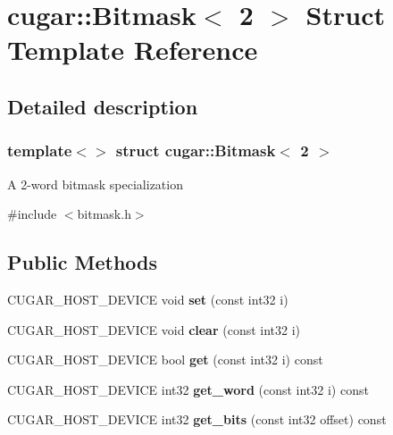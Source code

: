 \hypertarget{structcugar_1_1_bitmask_3_012_01_4}{}\section{cugar\+:\+:Bitmask$<$ 2 $>$ Struct Template Reference}
\label{structcugar_1_1_bitmask_3_012_01_4}


\subsection{Detailed description}
\subsubsection*{template$<$$>$\newline
struct cugar\+::\+Bitmask$<$ 2 $>$}

A 2-\/word bitmask specialization 

{\ttfamily \#include $<$bitmask.\+h$>$}

\subsection*{Public Methods}
\begin{DoxyCompactItemize}
\item 
\mbox{\label{structcugar_1_1_bitmask_3_012_01_4_a0e225dc3e8291c745dbc266a827171de}} 
C\+U\+G\+A\+R\+\_\+\+H\+O\+S\+T\+\_\+\+D\+E\+V\+I\+CE void {\bfseries set} (const int32 i)
\item 
\mbox{\label{structcugar_1_1_bitmask_3_012_01_4_a9cb2358a9c07d633b57c29a302403754}} 
C\+U\+G\+A\+R\+\_\+\+H\+O\+S\+T\+\_\+\+D\+E\+V\+I\+CE void {\bfseries clear} (const int32 i)
\item 
\mbox{\label{structcugar_1_1_bitmask_3_012_01_4_a9793bc6e9915e95437b9c444717d176f}} 
C\+U\+G\+A\+R\+\_\+\+H\+O\+S\+T\+\_\+\+D\+E\+V\+I\+CE bool {\bfseries get} (const int32 i) const
\item 
\mbox{\label{structcugar_1_1_bitmask_3_012_01_4_a28a131d12d52e853b3ecef498c836402}} 
C\+U\+G\+A\+R\+\_\+\+H\+O\+S\+T\+\_\+\+D\+E\+V\+I\+CE int32 {\bfseries get\+\_\+word} (const int32 i) const
\item 
\mbox{\label{structcugar_1_1_bitmask_3_012_01_4_a6f98ad32f193dfc4e5f79a23a0826309}} 
C\+U\+G\+A\+R\+\_\+\+H\+O\+S\+T\+\_\+\+D\+E\+V\+I\+CE int32 {\bfseries get\+\_\+bits} (const int32 offset) const
\end{DoxyCompactItemize}
